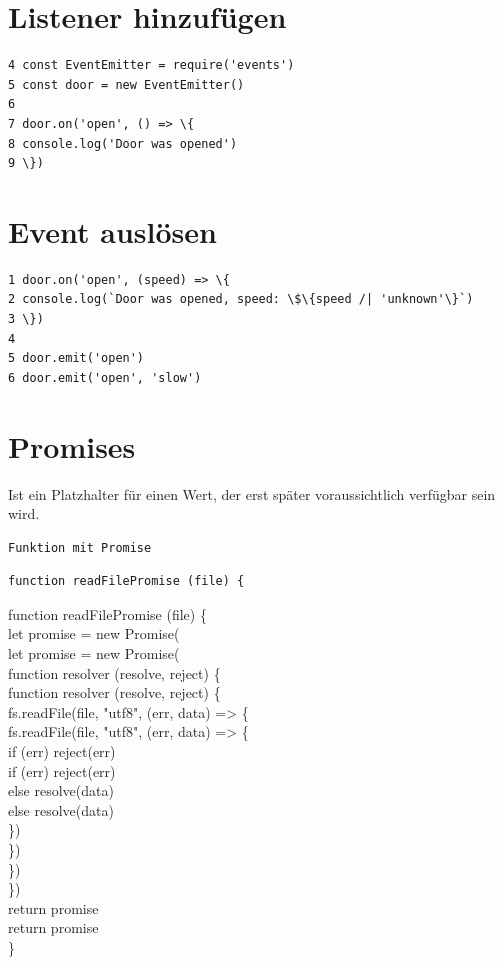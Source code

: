 \documentclass[10pt]{article}
\begin{document}
\section*{Listener hinzufügen}
\begin{verbatim}
4 const EventEmitter = require('events')
5 const door = new EventEmitter()
6
7 door.on('open', () => \{
8 console.log('Door was opened')
9 \})
\end{verbatim}

\section*{Event auslösen}
\begin{verbatim}
1 door.on('open', (speed) => \{
2 console.log(`Door was opened, speed: \$\{speed /| 'unknown'\}`)
3 \})
4
5 door.emit('open')
6 door.emit('open', 'slow')
\end{verbatim}

\section*{Promises}
Ist ein Platzhalter für einen Wert, der erst später voraussichtlich verfügbar sein wird.

\begin{verbatim}
Funktion mit Promise
\end{verbatim}

\begin{verbatim}
function readFilePromise (file) {
\end{verbatim}

function readFilePromise (file) \{\\
let promise = new Promise(\\
let promise = new Promise(\\
function resolver (resolve, reject) \{\\
function resolver (resolve, reject) \{\\
fs.readFile(file, "utf8", (err, data) => \{\\
fs.readFile(file, "utf8", (err, data) => \{\\
if (err) reject(err)\\
if (err) reject(err)\\
else resolve(data)\\
else resolve(data)\\
\})\\
\})\\
\})\\
\})\\
return promise\\
return promise\\
\}
\end{document}
